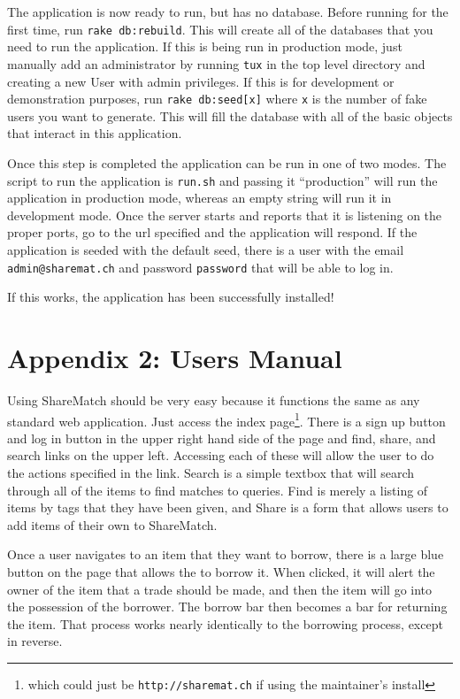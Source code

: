\documentclass{acm_proc_article-sp}
\begin{document}
The application is now ready to run, but has no database.  Before running for the first time,  run \texttt{rake db:rebuild}. This will create all of the databases that you need to run the application.  If this is being run in production mode, just manually add an administrator by running \texttt{tux} in the top level directory and creating a new User with admin privileges.  If this is for development or demonstration purposes, run \texttt{rake db:seed[x]} where \texttt{x} is the number of fake users you want to generate.  This will fill the database with all of the basic objects that interact in this application.  

Once this step is completed the application can be run in one of two modes.  The script to run the application is \texttt{run.sh} and passing it ``production'' will run the application in production mode, whereas an empty string will run it in development mode. Once the server starts and reports that it is listening on the proper ports, go to the url specified and the application will respond.  If the application is seeded with the default seed, there is a user with the email \texttt{admin@sharemat.ch} and password \texttt{password} that will be able to log in.

If this works, the application has been successfully installed!
\section{Appendix 2: Users Manual}
Using ShareMatch should be very easy because it functions the same as any standard web application.  Just access the index page\footnote{which could just be \texttt{http://sharemat.ch} if using the maintainer's install}.  There is a sign up button and log in button in the upper right hand side of the page and find, share, and search links on the upper left. Accessing each of these will allow the user to do the actions specified in the link.  Search is a simple textbox that will search through all of the items to find matches to queries.  Find is merely a listing of items by tags that they have been given, and Share is a form that allows users to add items of their own to ShareMatch.

Once a user navigates to an item that they want to borrow, there is a large blue button on the page that allows the to borrow it.  When clicked, it will alert the owner of the item that a trade should be made, and then the item will go into the possession of the borrower.  The borrow bar then becomes a bar for returning the item.  That process works nearly identically to the borrowing process, except in reverse.
\end{document}
